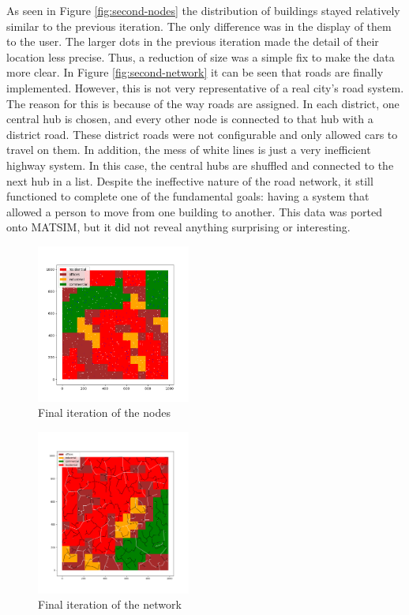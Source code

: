 \documentclass[11pt]{article}
\begin{document}
\begin{multicols}{2}
    \quad As seen in Figure \ref{fig:second-nodes} the distribution of buildings stayed relatively similar to the previous iteration. The only difference was in the display of them to the user. The larger dots in the previous iteration made the detail of their location less precise. Thus, a reduction of size was a simple fix to make the data more clear. In Figure \ref{fig:second-network} it can be seen that roads are finally implemented. However, this is not very representative of a real city's road system. The reason for this is because of the way roads are assigned. In each district, one central hub is chosen, and every other node is connected to that hub with a district road. These district roads were not configurable and only allowed cars to travel on them. In addition, the mess of white lines is just a very inefficient highway system. In this case, the central hubs are shuffled and connected to the next hub in a list. Despite the ineffective nature of the road network, it still functioned to complete one of the fundamental goals: having a system that allowed a person to move from one building to another. This data was ported onto MATSIM\cite{matsim}, but it did not reveal anything surprising or interesting. \\

    \begin{figure}[H]
        \centering
        \includegraphics[width=0.45\textwidth]{images/finalzoningwnodes.png}
        \caption{Final iteration of the nodes}
        \label{fig:final-zoning-nodes}
    \end{figure}

    \begin{figure}[H]
        \centering
        \includegraphics[width=0.45\textwidth]{images/finalnetwork.png}
        \caption{Final iteration of the network}
        \label{fig:final-network}
    \end{figure}


\end{multicols}
\end{document}
